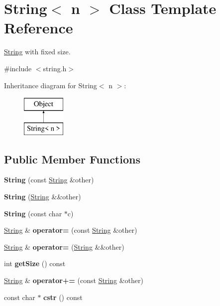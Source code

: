 \hypertarget{classString}{}\section{String$<$ n $>$ Class Template Reference}
\label{classString}


\hyperlink{classString}{String} with fixed size.  




{\ttfamily \#include $<$string.\+h$>$}

Inheritance diagram for String$<$ n $>$\+:\begin{figure}[H]
\begin{center}
\leavevmode
\includegraphics[height=2.000000cm]{classString}
\end{center}
\end{figure}
\subsection*{Public Member Functions}
\begin{DoxyCompactItemize}
\item 
\hypertarget{classString_aa6ab4739fa16748f87dda2f40ffc3944}{}\label{classString_aa6ab4739fa16748f87dda2f40ffc3944} 
{\bfseries String} (const \hyperlink{classString}{String} \&other)
\item 
\hypertarget{classString_a46961739cbc3875d29b3e81c9256c9bd}{}\label{classString_a46961739cbc3875d29b3e81c9256c9bd} 
{\bfseries String} (\hyperlink{classString}{String} \&\&other)
\item 
\hypertarget{classString_aa70bce8a2c79015b1fa76665a37ce34f}{}\label{classString_aa70bce8a2c79015b1fa76665a37ce34f} 
{\bfseries String} (const char $\ast$c)
\item 
\hypertarget{classString_abe94f2117b8be43cc64da71f3709d49e}{}\label{classString_abe94f2117b8be43cc64da71f3709d49e} 
\hyperlink{classString}{String} \& {\bfseries operator=} (const \hyperlink{classString}{String} \&other)
\item 
\hypertarget{classString_a3d048c5db2b781410be579c6f96c2cd3}{}\label{classString_a3d048c5db2b781410be579c6f96c2cd3} 
\hyperlink{classString}{String} \& {\bfseries operator=} (\hyperlink{classString}{String} \&\&other)
\item 
\hypertarget{classString_a4fdbc8f2444b95eea7571072f78e6730}{}\label{classString_a4fdbc8f2444b95eea7571072f78e6730} 
int {\bfseries get\+Size} () const
\item 
\hypertarget{classString_a1237325617a158c678a87a441e0ae1b2}{}\label{classString_a1237325617a158c678a87a441e0ae1b2} 
\hyperlink{classString}{String} \& {\bfseries operator+=} (const \hyperlink{classString}{String} \&other)
\item 
\hypertarget{classString_a97f56d2f85f18be35b65b3e3fe296d14}{}\label{classString_a97f56d2f85f18be35b65b3e3fe296d14} 
const char $\ast$ {\bfseries cstr} () const
\end{DoxyCompactItemize}
